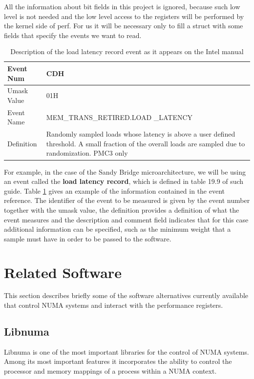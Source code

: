 All the information about bit fields in this project is ignored, because such low level is not needed and the low level access to the registers will be performed by the kernel side of perf. For us it will be necessary only to fill a struct with some fields that specify the events we want to read.
\begin{table}
	\centering
		\begin{tabularx}{\textwidth}{|l|X|}
		\hline
			Event Num & CDH\\
			\hline
			Umask Value & 01H\\
			\hline
			Event Name & MEM\_TRANS\_RETIRED.LOAD \_LATENCY\\
			\hline
			Definition & Randomly sampled loads whose latency is above a user defined threshold. A small fraction of the overall loads are sampled due to randomization. PMC3 only\\
			\hline
		\end{tabularx}
		\caption{Description of the load latency record event as it appears on the Intel manual}
		\label{table:lldescr}
\end{table}
For example, in the case of the Sandy Bridge microarchitecture, we will be using an event called the \textbf{load latency record}, which is defined in table 19.9 of such guide. Table \ref{table:lldescr} gives an example of the information contained in the event reference. The identifier of the event to be measured is given by the event number together with the umask value, the definition provides a definition of what the event measures and the description and comment field indicates that for this case additional information can be specified, such as the minimum weight that a sample must have in order to be passed to the software.

\section{Related Software}\label{section:relatedsw}
This section describes briefly some of the software alternatives currently available that control NUMA systems and interact with the performance registers.
\subsection{Libnuma}\label{subsection:libnuma}

Libnuma \cite{libnuma} is one of the most important libraries for the control of NUMA systems. Among its most important features it incorporates the ability to control the processor and memory mappings of a process within a NUMA context.

